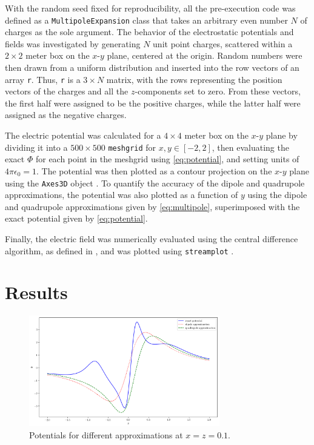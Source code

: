\documentclass[12pt,a4paper,twoside]{article}
\begin{document}
With the random seed fixed for reproducibility, all the pre-execution code was defined as a \texttt{MultipoleExpansion} class that takes an arbitrary even number $N$ of charges as the sole argument. The behavior of the electrostatic potentials and fields was investigated by generating $N$ unit point charges, scattered within a $2 \times 2$ meter box on the $x$-$y$ plane, centered at the origin. Random numbers were then drawn from a uniform distribution and inserted into the row vectors of an array \texttt{r}. Thus, \texttt{r} is a $3 \times N$ matrix, with the rows representing the position vectors of the charges and all the $z$-components set to zero. From these vectors, the first half were assigned to be the positive charges, while the latter half were assigned as the negative charges.

The electric potential was calculated for a $4 \times 4$ meter box on the $x$-$y$ plane by dividing it into a $500 \times 500$ \texttt{meshgrid} for $x,y \in [-2,2]$, then evaluating the exact $\Phi$ for each point in the meshgrid using \eqref{eq:potential}, and setting units of $4\pi\epsilon_0 = 1$. The potential was then plotted as a contour projection on the $x$-$y$ plane using the \texttt{Axes3D} object \cite{matplotlib}. To quantify the accuracy of the dipole and quadrupole approximations, the potential was also plotted as a function of $y$ using the dipole and quadrupole approximations given by \eqref{eq:multipole}, superimposed with the exact potential given by \eqref{eq:potential}.

Finally, the electric field was numerically evaluated using the central difference algorithm, as defined in \cite{wilmott}\cite{olver}, and was plotted using \texttt{streamplot} \cite{christian}.

\section{Results}
\label{sec:RnD}
\medskip

\begin{figure}[tb]
	\centering
	\includegraphics[width=0.74\textwidth]{116.png}
	\caption{Potentials for different approximations at $x = z = 0.1$.}
	\label{fig:approx}
\end{figure}
\end{document}
